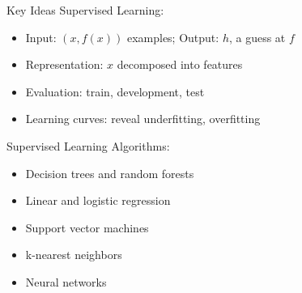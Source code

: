 \documentclass[14pt]{beamer}
\begin{document}
\begin{frame}{Key Ideas}
Supervised Learning:
\begin{itemize}
\item Input: $(x, f(x))$ examples; Output: $h$, a guess at $f$
\item Representation: $x$ decomposed into features
\item Evaluation: train, development, test
\item Learning curves: reveal underfitting, overfitting
\end{itemize}
Supervised Learning Algorithms:
\begin{itemize}
\item Decision trees and random forests
\item Linear and logistic regression
\item Support vector machines
\item k-nearest neighbors
\item Neural networks
\end{itemize}
\end{frame}
\end{document}
